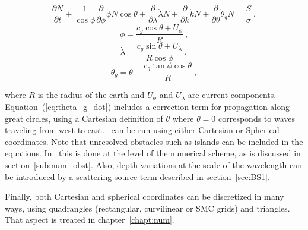 
\begin{equation}
\frac{\partial N}{\partial t} +
\frac{1}{\cos \phi} \frac{\partial}{\partial \phi} \dot{\phi}
    N \cos \theta +
\frac{\partial}{\partial \lambda} \dot{\lambda}N +
\frac{\partial}{\partial k} \dot{k} N +
\frac{\partial}{\partial \theta} \dot{\theta}_g N
= \frac{S}{\sigma} \: ,\label{eq:bal_sphere}
\end{equation}
\begin{equation}
\dot{\phi} = \frac{c_g \cos \theta + U_\phi}{R}
\: , \label{eq:phi_dot}
\end{equation}
\begin{equation}
\dot{\lambda} =  \frac{c_g \sin \theta + U_\lambda}{R \cos \phi}
\: , \label{eq:lambda_dot}
\end{equation}
\begin{equation}
\dot{\theta}_g = \dot{\theta} -
\frac{c_g \tan \phi \cos \theta}{R}
\: , \label{eq:theta_g_dot}
\end{equation}

\noindent
where $R$ is the radius of the earth and $U_\phi$ and $U_\lambda$ are current
components. Equation~(\ref{eq:theta_g_dot}) includes a correction term for
propagation along great circles, using a Cartesian definition of $\theta$
where $\theta = 0$ corresponds to waves traveling from west to east. \ws\ can
be run using either Cartesian or Spherical coordinates. Note that unresolved obstacles
such as islands can be included in the equations. In \ws\ this is done at the
level of the numerical scheme, as is discussed in section~\ref{sub:num_obst}. Also, depth variations 
at the scale of the wavelength can be introduced by a scattering source term described in 
 section~\ref{sec:BS1}. 
 
 Finally, both Cartesian  and spherical coordinates can be discretized in many ways, using quadrangles (rectangular, curvilinear or SMC grids) and triangles. 
That aspect is treated in chapter~\ref{chapt:num}.
